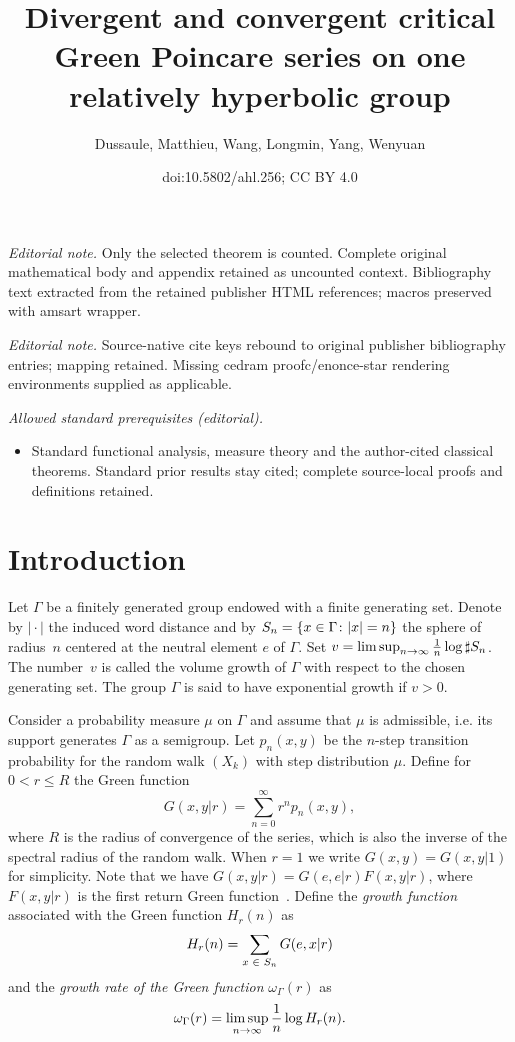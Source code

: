 \documentclass[10pt]{amsart}
\title{Divergent and convergent critical Green Poincare series on one relatively hyperbolic group}
\author{Dussaule, Matthieu, Wang, Longmin, Yang, Wenyuan}
\date{doi:10.5802/ahl.256; CC BY 4.0}
\theoremstyle{definition}\newtheorem{defi}[theo]{Definition}\newtheorem{rema}[theo]{Remark}\newtheorem{exam}[theo]{Example}\newtheorem{exem}[theo]{Example}\newtheorem{nota}[theo]{Notation}
\let\originalleft\left
\let\originalright\right
\renewcommand{\left}{\mathopen{}\mathclose\bgroup\originalleft}
\renewcommand{\right}{\aftergroup\egroup\originalright}
\let\oldin\in
\renewcommand{\in}{\mathchoice{\oldin}{\oldin}{\,\oldin\,}{\,\oldin\,}}
\renewcommand*{\to}{\mathchoice{\longrightarrow}{\rightarrow}{\rightarrow}{\rightarrow}}
\begin{document}
\maketitle
\noindent\textit{Editorial note.} Only the selected theorem is counted. Complete original mathematical body and appendix retained as uncounted context. Bibliography text extracted from the retained publisher HTML references; macros preserved with amsart wrapper.\par\medskip
\noindent\textit{Editorial note.} Source-native cite keys rebound to original publisher bibliography entries; mapping retained. Missing cedram proofc/enonce-star rendering environments supplied as applicable.\par\medskip
\noindent\textit{Allowed standard prerequisites (editorial).}\begin{itemize}
\item Standard functional analysis, measure theory and the author-cited classical theorems. Standard prior results stay cited; complete source-local proofs and definitions retained.
\end{itemize}\medskip

\section{Introduction}


Let $\Gamma$ be a finitely generated group endowed with a finite generating set. Denote by $|\!\cdot\!|$ the induced word distance and by $S_n = \left\{ x \in \Gamma \colon |x| =n \right\}$ the sphere of radius~$n$ centered at the neutral element $e$ of $\Gamma$. Set $v=\limsup_{n\to\infty} \frac{1}{n}\log \sharp S_n$. The number~$v$ is called the volume growth of $\Gamma$ with respect to the chosen generating set. The group $\Gamma$ is said to have exponential growth if $v>0$.


Consider a probability measure $\mu$ on $\Gamma$ and assume that $\mu$ is admissible, i.e. its support generates $\Gamma$ as a semigroup. Let $p_n(x, y)$ be the $n$-step transition probability for the random walk $(X_k)$ with step distribution $\mu$. Define for $0 < r \leq R$ the Green function
\[
G(x, y | r) = \sum_{n = 0}^{\infty} r^n p_n(x, y),
\]
where $R$ is the radius of convergence of the series, which is also the inverse of the spectral radius of the random walk. When $r = 1$ we write $G(x, y) = G(x, y | 1)$ for simplicity. Note that we have $G(x, y | r) = G(e, e | r) F(x, y | r)$, where $F(x, y | r)$ is the first return Green function~\cite[Lemma~1.13]{Woessbook}. Define the \emph{growth function} associated with the Green function $H_r(n)$ as
\[
H_r(n) = \sum_{x \in S_n} G(e, x | r)
\]
and the \emph{growth rate of the Green function} $\omega_\Gamma(r)$ as
\[
\omega_{\Gamma}(r) = \limsup_{n \to \infty} \frac{1}{n} \log H_r(n).
\]
\end{document}
